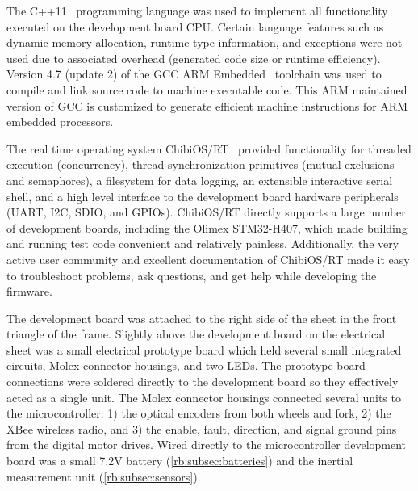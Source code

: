 The C++11~\cite{C++11} programming language was used to implement all
functionality executed on the development board CPU. Certain language
features such as dynamic memory allocation, runtime type information, and
exceptions were not used due to associated overhead (generated code size or
runtime efficiency). Version 4.7 (update 2) of the GCC ARM
Embedded~\cite{gccARMEmbedded} toolchain was used to compile and link source
code to machine executable code. This ARM maintained version of GCC is
customized to generate efficient machine instructions for ARM embedded
processors.

The real time operating system ChibiOS/RT~\cite{ChibiOS} provided functionality
for threaded execution (concurrency), thread synchronization primitives (mutual
exclusions and semaphores), a filesystem for data logging, an extensible
interactive serial shell, and a high level interface to the development board
hardware peripherals (UART, I2C, SDIO, and GPIOs). ChibiOS/RT directly supports
a large number of development boards, including the Olimex STM32-H407, which
made building and running test code convenient and relatively painless.
Additionally, the very active user community and excellent documentation of
ChibiOS/RT made it easy to troubleshoot problems, ask questions, and get help
while developing the firmware.

The development board was attached to the right side of the sheet in the front
triangle of the frame. Slightly above the development board on the electrical
sheet was a small electrical prototype board which held several small
integrated circuits, Molex connector housings, and two LEDs. The prototype
board connections were soldered directly to the development board so they
effectively acted as a single unit. The Molex connector housings connected
several units to the microcontroller: 1) the optical encoders from both wheels
and fork, 2) the XBee wireless radio, and 3) the enable, fault, direction, and
signal ground pins from the digital motor drives. Wired directly to the
microcontroller development board was a small 7.2V battery
(\autoref{rb:subsec:batteries}) and the inertial measurement unit
(\autoref{rb:subsec:sensors}).


